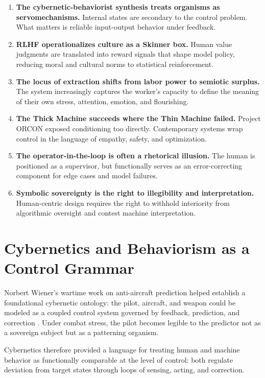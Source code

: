 \documentclass[runningheads]{llncs}
\begin{document}
\begin{enumerate}
\item \textbf{The cybernetic-behaviorist synthesis treats organisms as servomechanisms.} Internal states are secondary to the control problem. What matters is reliable input-output behavior under feedback.

\item \textbf{RLHF operationalizes culture as a Skinner box.} Human value judgments are translated into reward signals that shape model policy, reducing moral and cultural norms to statistical reinforcement.

\item \textbf{The locus of extraction shifts from labor power to semiotic surplus.} The system increasingly captures the worker's capacity to define the meaning of their own stress, attention, emotion, and flourishing.

\item \textbf{The Thick Machine succeeds where the Thin Machine failed.} Project ORCON exposed conditioning too directly. Contemporary systems wrap control in the language of empathy, safety, and optimization.

\item \textbf{The operator-in-the-loop is often a rhetorical illusion.} The human is positioned as a supervisor, but functionally serves as an error-correcting component for edge cases and model failures.

\item \textbf{Symbolic sovereignty is the right to illegibility and interpretation.} Human-centric design requires the right to withhold interiority from algorithmic oversight and contest machine interpretation.
\end{enumerate}

\section{Cybernetics and Behaviorism as a Control Grammar}

Norbert Wiener's wartime work on anti-aircraft prediction helped establish a foundational cybernetic ontology: the pilot, aircraft, and weapon could be modeled as a coupled control system governed by feedback, prediction, and correction \cite{wiener1948cybernetics}. Under combat stress, the pilot becomes legible to the predictor not as a sovereign subject but as a patterning organism.

Cybernetics therefore provided a language for treating human and machine behavior as functionally comparable at the level of control: both regulate deviation from target states through loops of sensing, acting, and correction.
\end{document}
